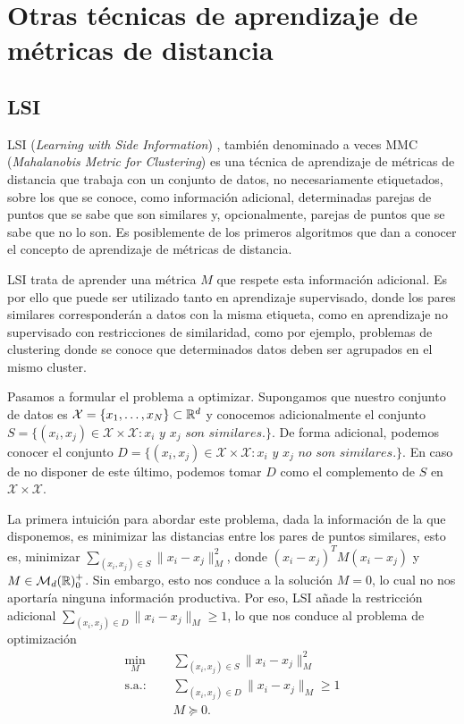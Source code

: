 \section{Otras técnicas de aprendizaje de métricas de distancia}

\subsection{LSI} \label{lsi}

LSI (\emph{Learning with Side Information}) \cite{lsi}, también denominado a veces MMC (\emph{Mahalanobis Metric for Clustering}) es una técnica de aprendizaje de métricas de distancia que trabaja con un conjunto de datos, no necesariamente etiquetados, sobre los que se conoce, como información adicional, determinadas parejas de puntos que se sabe que son similares y, opcionalmente, parejas de puntos que se sabe que no lo son. Es posiblemente de los primeros algoritmos que dan a conocer el concepto de aprendizaje de métricas de distancia.

LSI trata de aprender una métrica $M$ que respete esta información adicional. Es por ello que puede ser utilizado tanto en aprendizaje supervisado, donde los pares similares corresponderán a datos con la misma etiqueta, como en aprendizaje no supervisado con restricciones de similaridad, como por ejemplo, problemas de clustering donde se conoce que determinados datos deben ser agrupados en el mismo cluster.

Pasamos a formular el problema a optimizar. Supongamos que nuestro conjunto de datos es $\mathcal{X} = \{x_1,\dots,x_N\} \subset \mathbb{R}^d$ y conocemos adicionalmente el conjunto $S = \{(x_i,x_j) \in \mathcal{X}\times\mathcal{X} \colon x_i \textit{ y } x_j \textit{ son similares.}\}$. De forma adicional, podemos conocer el conjunto $D = \{(x_i,x_j) \in \mathcal{X}\times\mathcal{X} \colon x_i \textit{ y } x_j \textit{ no son similares.} \}$. En caso de no disponer de este último, podemos tomar $D$ como el complemento de $S$ en $\mathcal{X} \times \mathcal{X}$.

La primera intuición para abordar este problema, dada la información de la que disponemos, es minimizar las distancias entre los pares de puntos similares, esto es, minimizar $\sum_{(x_i,x_j)\in S} \|x_i - x_j \|_M^2$, donde $(x_i - x_j)^T M (x_i - x_j)$ y $M \in \mathcal{M}_{d}(\mathbb{R})^+_0$. Sin embargo, esto nos conduce a la solución $M = 0$, lo cual no nos aportaría ninguna información productiva. Por eso, LSI añade la restricción adicional $\sum_{(x_i,x_j) \in D} \|x_i - x_j\|_M \ge 1$, lo que nos conduce al problema de optimización
\begin{equation} \label{eq:lsi}
\begin{split}
    \min_{M} &\quad \sum_{(x_i,x_j)\in S}  \|x_i - x_j \|_M^2 \\
    \text{s.a.: } &\quad \sum_{(x_i,x_j) \in D} \|x_i - x_j\|_M \ge 1 \\
                  &\quad M \succeq 0.
\end{split}
\end{equation}


